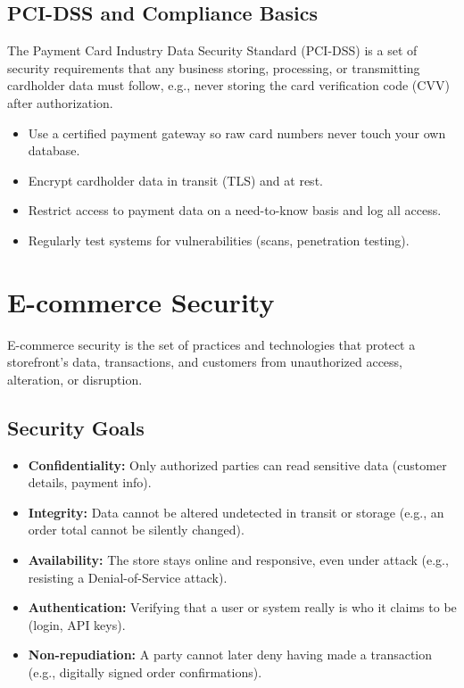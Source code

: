 \documentclass[11pt,a4paper]{article}
\begin{document}
\subsection{PCI-DSS and Compliance Basics}
\begin{definitionbox}
The Payment Card Industry Data Security Standard (PCI-DSS) is a set of security requirements that any business storing, processing, or transmitting cardholder data must follow, e.g., never storing the card verification code (CVV) after authorization.
\end{definitionbox}
\begin{itemize}[leftmargin=*]
  \item Use a certified payment gateway so raw card numbers never touch your own database.
  \item Encrypt cardholder data in transit (TLS) and at rest.
  \item Restrict access to payment data on a need-to-know basis and log all access.
  \item Regularly test systems for vulnerabilities (scans, penetration testing).
\end{itemize}

\section{E-commerce Security}

\begin{definitionbox}
E-commerce security is the set of practices and technologies that protect a storefront's data, transactions, and customers from unauthorized access, alteration, or disruption.
\end{definitionbox}

\subsection{Security Goals}
\begin{conceptbox}
\begin{itemize}[leftmargin=*]
  \item \textbf{Confidentiality:} Only authorized parties can read sensitive data (customer details, payment info).
  \item \textbf{Integrity:} Data cannot be altered undetected in transit or storage (e.g., an order total cannot be silently changed).
  \item \textbf{Availability:} The store stays online and responsive, even under attack (e.g., resisting a Denial-of-Service attack).
  \item \textbf{Authentication:} Verifying that a user or system really is who it claims to be (login, API keys).
  \item \textbf{Non-repudiation:} A party cannot later deny having made a transaction (e.g., digitally signed order confirmations).
\end{itemize}
\end{conceptbox}
\end{document}
